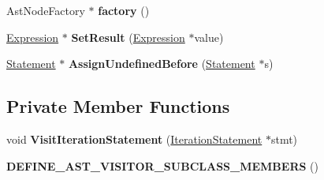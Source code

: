 \begin{DoxyCompactItemize}
\item 
Ast\+Node\+Factory $\ast$ {\bfseries factory} ()\hypertarget{classv8_1_1internal_1_1_processor_af642af827c6cc75d6d466e1e2a27d25c}{}\label{classv8_1_1internal_1_1_processor_af642af827c6cc75d6d466e1e2a27d25c}

\item 
\hyperlink{classv8_1_1internal_1_1_expression}{Expression} $\ast$ {\bfseries Set\+Result} (\hyperlink{classv8_1_1internal_1_1_expression}{Expression} $\ast$value)\hypertarget{classv8_1_1internal_1_1_processor_a50365754de1be5320dc3bfd29e4ca004}{}\label{classv8_1_1internal_1_1_processor_a50365754de1be5320dc3bfd29e4ca004}

\item 
\hyperlink{classv8_1_1internal_1_1_statement}{Statement} $\ast$ {\bfseries Assign\+Undefined\+Before} (\hyperlink{classv8_1_1internal_1_1_statement}{Statement} $\ast$s)\hypertarget{classv8_1_1internal_1_1_processor_a7c4589695dcd10e2bc35cf10970db8cd}{}\label{classv8_1_1internal_1_1_processor_a7c4589695dcd10e2bc35cf10970db8cd}

\end{DoxyCompactItemize}
\subsection*{Private Member Functions}
\begin{DoxyCompactItemize}
\item 
void {\bfseries Visit\+Iteration\+Statement} (\hyperlink{classv8_1_1internal_1_1_iteration_statement}{Iteration\+Statement} $\ast$stmt)\hypertarget{classv8_1_1internal_1_1_processor_ab1bc96069f41d2e5b3de1ab320213750}{}\label{classv8_1_1internal_1_1_processor_ab1bc96069f41d2e5b3de1ab320213750}

\item 
{\bfseries D\+E\+F\+I\+N\+E\+\_\+\+A\+S\+T\+\_\+\+V\+I\+S\+I\+T\+O\+R\+\_\+\+S\+U\+B\+C\+L\+A\+S\+S\+\_\+\+M\+E\+M\+B\+E\+RS} ()\hypertarget{classv8_1_1internal_1_1_processor_a0d534d9977518eab7dcb83bc84416375}{}\label{classv8_1_1internal_1_1_processor_a0d534d9977518eab7dcb83bc84416375}

\end{DoxyCompactItemize}
